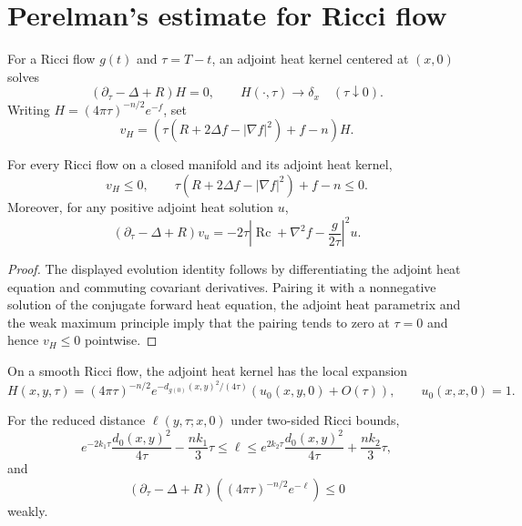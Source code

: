 \section{Perelman's estimate for Ricci flow}

\begin{definition}
\label{def:chow-ii-ch16-adjoint-heat-kernel}
For a Ricci flow $g(t)$ and $\tau=T-t$, an adjoint heat kernel centered at
$(x,0)$ solves
\[
\left(\partial_\tau-\Delta+R\right)H=0,
\qquad H(\cdot,\tau)\longrightarrow\delta_x\quad(\tau\downarrow0).
\]
Writing $H=(4\pi\tau)^{-n/2}e^{-f}$, set
\[
v_H=\left(\tau(R+2\Delta f-|\nabla f|^2)+f-n\right)H.
\]
\end{definition}

\begin{theorem}
\label{thm:chow-ii-ch16-perelman-harnack}
For every Ricci flow on a closed manifold and its adjoint heat kernel,
\[
v_H\le0,\qquad
\tau(R+2\Delta f-|\nabla f|^2)+f-n\le0.
\]
Moreover, for any positive adjoint heat solution $u$,
\[
\left(\partial_\tau-\Delta+R\right)v_u
 =-2\tau\left|\operatorname{Rc}+\nabla^2f-\frac{g}{2\tau}\right|^2u.
\]
\end{theorem}
\begin{proof}
The displayed evolution identity follows by differentiating the adjoint heat
equation and commuting covariant derivatives. Pairing it with a nonnegative
solution of the conjugate forward heat equation, the adjoint heat parametrix
and the weak maximum principle imply that the pairing tends to zero at
$\tau=0$ and hence $v_H\le0$ pointwise.
\end{proof}

\begin{theorem}
\label{thm:chow-ii-ch16-adjoint-parametrix}
On a smooth Ricci flow, the adjoint heat kernel has the local expansion
\[
H(x,y,\tau)=(4\pi\tau)^{-n/2}e^{-d_{g(0)}(x,y)^2/(4\tau)}
 (u_0(x,y,0)+O(\tau)),\qquad u_0(x,x,0)=1.
\]
\end{theorem}

\begin{lemma}
\label{lem:chow-ii-ch16-reduced-distance-subsolution}
For the reduced distance $\ell(y,\tau;x,0)$ under two-sided Ricci bounds,
\[
e^{-2k_1\tau}\frac{d_0(x,y)^2}{4\tau}-\frac{nk_1}{3}\tau
\le\ell\le e^{2k_2\tau}\frac{d_0(x,y)^2}{4\tau}+\frac{nk_2}{3}\tau,
\]
and
\[
\left(\partial_\tau-\Delta+R\right)
 \left((4\pi\tau)^{-n/2}e^{-\ell}\right)\le0
\]
weakly.
\end{lemma}

